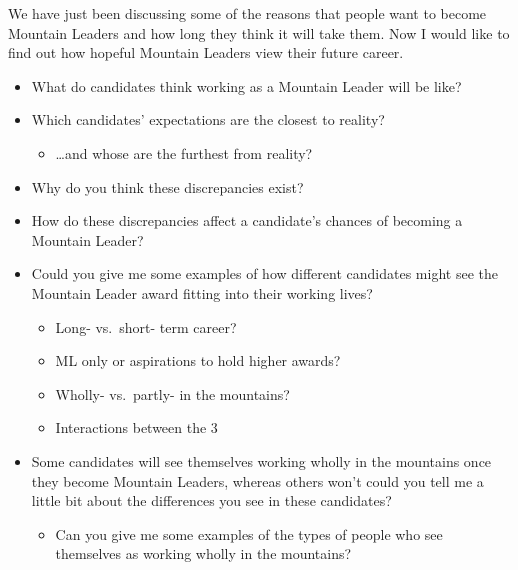 \documentclass[
  12pt,
  a4paper,
]{book}
\providecommand{\tightlist}{%
  \setlength{\itemsep}{0pt}\setlength{\parskip}{0pt}}
\begin{document}
We have just been discussing some of the reasons that people want to become Mountain Leaders and how long they think it will take them. Now I would like to find out how hopeful Mountain Leaders view their future career.

\begin{itemize}
\tightlist
\item
  What do candidates think working as a Mountain Leader will be like?
\item
  Which candidates' expectations are the closest to reality?

  \begin{itemize}
  \tightlist
  \item
    \ldots and whose are the furthest from reality?
  \end{itemize}
\item
  Why do you think these discrepancies exist?
\item
  How do these discrepancies affect a candidate's chances of becoming a Mountain Leader?
\item
  Could you give me some examples of how different candidates might see the Mountain Leader award fitting into their working lives?

  \begin{itemize}
  \tightlist
  \item
    Long- vs.~short- term career?
  \item
    ML only or aspirations to hold higher awards?
  \item
    Wholly- vs.~partly- in the mountains?
  \item
    Interactions between the 3
  \end{itemize}
\item
  Some candidates will see themselves working wholly in the mountains once they become Mountain Leaders, whereas others won't could you tell me a little bit about the differences you see in these candidates?

  \begin{itemize}
  \tightlist
  \item
    Can you give me some examples of the types of people who see themselves as working wholly in the mountains?


\end{itemize}
\end{itemize}
\end{document}
